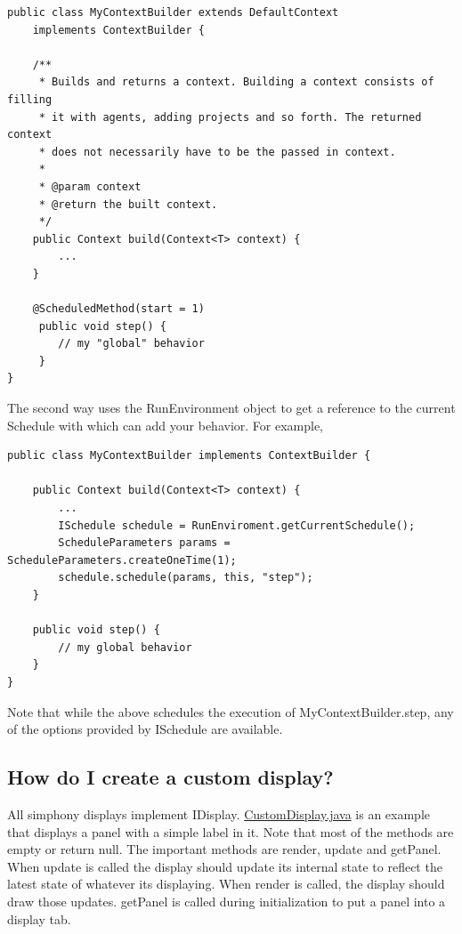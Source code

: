 \documentclass[11pt]{article}
\begin{document}
\noindent\begin{minipage}[h]{\textwidth}
\vspace{.2in}
\lstset{language=java}
\begin{lstlisting}
public class MyContextBuilder extends DefaultContext 
	implements ContextBuilder {

	/**
	 * Builds and returns a context. Building a context consists of filling 
	 * it with agents, adding projects and so forth. The returned context
	 * does not necessarily have to be the passed in context.
	 *
	 * @param context
	 * @return the built context.
	 */
	public Context build(Context<T> context) {
		...
	}
	
	@ScheduledMethod(start = 1)
	 public void step() {
	   	// my "global" behavior
	 }
}
\end{lstlisting}
\vspace{.2in}
\end{minipage}

The second way uses the RunEnvironment object to get a reference to the current Schedule with which can add your behavior. For example,

\noindent\begin{minipage}[h]{\textwidth}
\vspace{.2in}
\lstset{language=java}
\begin{lstlisting}
public class MyContextBuilder implements ContextBuilder {

	public Context build(Context<T> context) {
		...
		ISchedule schedule = RunEnviroment.getCurrentSchedule();
		ScheduleParameters params = ScheduleParameters.createOneTime(1);
		schedule.schedule(params, this, "step");
	}

 	public void step() {
   		// my global behavior
 	}
}
\end{lstlisting}
\vspace{.2in}
\end{minipage}

Note that while the above schedules the execution of MyContextBuilder.step, any of the options provided by ISchedule are available.

\subsection{How do I create a custom display?}
\label{prs:custom_display}

All simphony displays implement IDisplay. \href{http://repast.sourceforge.net/docs/CustomDisplay.java}{CustomDisplay.java} is an example that displays a panel with a simple label in it. Note that most of the methods are empty or return null. The important methods are render, update and getPanel. When update is called the display should update its internal state to reflect the latest state of whatever its displaying. When render is called, the display should draw those updates. getPanel is called during initialization to put a panel into a display tab.
\end{document}
